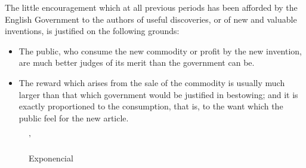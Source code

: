 \documentclass{aa}
\begin{document}
The little encouragement which at all previous periods has been afforded
by the English Government to the authors of useful discoveries, or of
new and valuable inventions, is justified on the following grounds:


\begin{itemize}
    \item The public, who consume the new commodity or profit by the new
invention, are much better judges of its merit than the government can
be.

    \item The reward which arises from the sale of the commodity is usually
much larger than that which government would be justified in bestowing;
and it is exactly proportioned to the consumption, that is, to the want
which the public feel for the new article.
\end{itemize}


\begin{figure}
    '
    \caption[]{Exponencial}
    \label{ztrend}
\end{figure}
\end{document}
